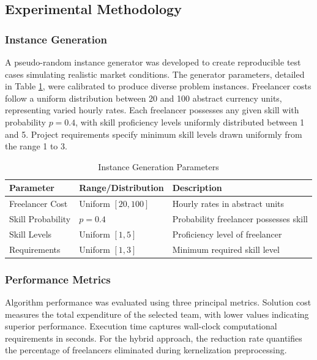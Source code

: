 \documentclass[12pt,a4paper]{article}
\begin{document}
\subsection{Experimental Methodology}
\label{subsec:experimental-methodology}

\subsubsection{Instance Generation}

A pseudo-random instance generator was developed to create reproducible test cases simulating realistic market conditions. The generator parameters, detailed in Table \ref{tab:instance-parameters}, were calibrated to produce diverse problem instances. Freelancer costs follow a uniform distribution between 20 and 100 abstract currency units, representing varied hourly rates. Each freelancer possesses any given skill with probability $p=0.4$, with skill proficiency levels uniformly distributed between 1 and 5. Project requirements specify minimum skill levels drawn uniformly from the range 1 to 3.

\begin{table}[H]
	\centering
	\caption{Instance Generation Parameters}
	\label{tab:instance-parameters}
	\begin{tabular}{@{}lll@{}}
		\toprule
		\textbf{Parameter} & \textbf{Range/Distribution} & \textbf{Description} \\
		\midrule
		Freelancer Cost & Uniform $[20, 100]$ & Hourly rates in abstract units \\
		Skill Probability & $p=0.4$ & Probability freelancer possesses skill \\
		Skill Levels & Uniform $[1, 5]$ & Proficiency level of freelancer \\
		Requirements & Uniform $[1, 3]$ & Minimum required skill level \\
		\bottomrule
	\end{tabular}
\end{table}

\subsubsection{Performance Metrics}

Algorithm performance was evaluated using three principal metrics. Solution cost measures the total expenditure of the selected team, with lower values indicating superior performance. Execution time captures wall-clock computational requirements in seconds. For the hybrid approach, the reduction rate quantifies the percentage of freelancers eliminated during kernelization preprocessing.
\end{document}
